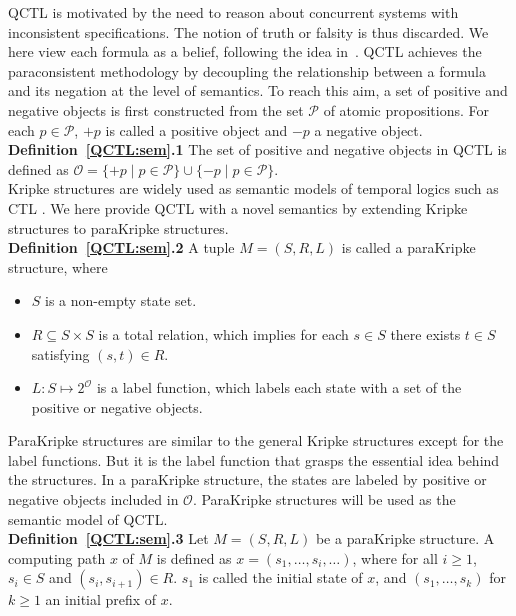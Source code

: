 \documentclass{entcs}
\begin{document}
 QCTL is motivated by the need to reason about concurrent systems
with inconsistent specifications. The notion of truth or falsity
is thus discarded. We here view each formula as a belief,
following the idea in~\cite{Hunter1}. QCTL achieves the
paraconsistent methodology by decoupling the relationship between
a formula and its negation at the level of semantics. To reach
this aim, a set of positive and negative objects is first
constructed from the set $\mathcal{P}$ of atomic propositions. For
each $p\in\mathcal{P}$, $+p$ is called a
positive object and $-p$ a negative object.\\

\noindent\textbf{Definition~\ref{QCTL:sem}.1}  The set of positive
and negative objects in QCTL is defined as
$\mathcal{O}=\{+p\;|\;p\in
\mathcal{P}\}\cup\{-p\;|\; p\in\mathcal{P}\}.$ \\

Kripke structures are widely used as semantic models of temporal
logics such as CTL \cite{kri1}. We here provide QCTL with a novel
semantics by extending Kripke structures to
paraKripke structures. \\

\noindent\textbf{Definition~\ref{QCTL:sem}.2} A tuple $M=(S,R,L)$
is called a paraKripke structure, where
\begin{itemize}
\item ${S}$ is a non-empty state set. \item ${R\subseteq S\times
S}$ is a total relation, which implies for each $s\in S$ there
exists $t\in S$ satisfying $(s,t)\in R$. \item ${L:S\mapsto
2^{\mathcal{O}}}$ is a label function, which labels each state
with a set of the positive or negative objects.
\end{itemize}
ParaKripke structures are similar to the general Kripke structures
except for the label functions. But it is the label function that
grasps the essential idea behind the structures. In a paraKripke
structure, the states are labeled by positive or negative objects
included in $\mathcal{O}$.
ParaKripke structures will be used as the semantic model of QCTL.\\

\noindent\textbf{Definition~\ref{QCTL:sem}.3} Let $M=(S,R,L)$ be a
paraKripke structure. A computing path $x$ of $M$ is defined as
$x=(s_1, \ldots, s_i, \ldots)$, where for all $i\geq 1$, $s_i\in
S$ and $(s_i,s_{i+1})\in R$. $s_1$ is called the initial state of
$x$, and $(s_1,\ldots,s_k)$ for $k\ge 1$ an initial
prefix of $x$. \\
\end{document}
